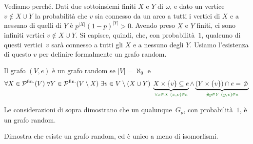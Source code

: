 Vediamo perch\'e. Dati due sottoinsiemi finiti $X$ e $Y$ di $\omega$, e
dato un vertice $v \not \in X \cup Y$ la probabilit\`a che $v$ sia connesso da un arco a tutti i vertici di $X$ e a nessuno di quelli di $Y$
\`e $p^{|X|}(1 - p)^{|Y|} > 0$. Avendo preso $X$ e $Y$ finiti, ci sono
infiniti vertici $v \not \in X \cup Y$.
Si capisce, quindi, che, con probabilit\`a~$1$, qualcuno di questi
vertici~$v$ sar\`a connesso 
a tutti gli $X$ e a nessuno degli $Y$. Usiamo l'esistenza di questo $v$
per definire formalmente {\drkred un} grafo random.

\begin{definition}
	Il grafo $(V,e)$ \`e un grafo random se $|V|=\aleph_0$ e
	\[ \forall {X\in\psf(V)}\;\forall {Y\in\psf(V\setminus X)}\;
\exists {v \in V \setminus(X \cup Y)} \; \underbrace{X \times \{v\}
\subseteq e}_{{\drkgrn \forall {x\in X} \; (x,v) \in e}} \land
\underbrace{(Y \times \{v\}) \cap e = \emptyset}_{{\drkgrn\nexists {y \in
Y} \; (y,v) \in e}}
		\]
\end{definition}

Le considerazioni di sopra dimostrano che un qualunque~$G_p$, con
probabilit\`a~$1$, \`e un grafo random.

\begin{exercise}
	Dimostra che esiste un grafo random, ed \`e unico a meno di
isomorfismi.
\end{exercise}
